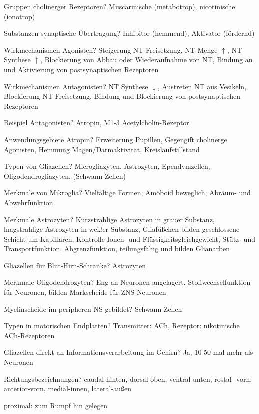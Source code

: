 \documentclass[a4paper]{article}
\begin{document}
\begin{multicols}{3}
  Gruppen cholinerger Rezeptoren? Muscarinische (metabotrop), nicotinische (ionotrop)

  Substanzen synaptische Übertragung? Inhibitor (hemmend), Aktivator (fördernd)

  Wirkmechanismen Agonisten? Steigerung NT-Freisetzung, NT Menge $\uparrow$, NT Synthese $\uparrow$, Blockierung von Abbau oder Wiederaufnahme von NT, Bindung an und Aktivierung von postsynaptischen Rezeptoren

  Wirkmechanismen Antagonisten? NT Synthese $\downarrow$, Austreten NT aus Vesikeln, Blockierung NT-Freisetzung, Bindung und Blockierung von postsynaptischen Rezeptoren

  Beispiel Antagonisten? Atropin, M1-3 Acetylcholin-Rezeptor


  Anwendungsgebiete Atropin? Erweiterung Pupillen, Gegengift cholinerge Agonisten, Hemmung Magen/Darmaktivität, Kreislaufstillstand

  Typen von Gliazellen? Microgliazyten, Astrozyten, Ependymzellen, Oligodendrogliazyten, (Schwann-Zellen)

  Merkmale von Mikroglia? Vielfältige Formen, Amöboid beweglich, Abräum- und Abwehrfunktion

  Merkmale Astrozyten? Kurzstrahlige Astrozyten in grauer Substanz, lnagstrahlige Astrozyten in weißer Substanz, Gliafüßchen bilden geschlossene Schicht um Kapillaren, Kontrolle Ionen- und Flüssigkeitsgleichgewicht, Stütz- und Transportfunktion, Abgrenzfunktion, teilungsfähig und bilden Glianarben

  Gliazellen für Blut-Hirn-Schranke? Astrozyten

  Merkmale Oligodendrozyten? Eng an Neuronen angelagert, Stoffwechselfunktion für Neuronen, bilden Markscheide für ZNS-Neuronen

  Myelinscheide im peripheren NS gebildet? Schwann-Zellen

  Typen in motorischen Endplatten? Transmitter: ACh, Rezeptor: nikotinische ACh-Rezeptoren

  Gliazellen direkt an Informationsverarbeitung im Gehirn? Ja, 10-50 mal mehr als Neuronen%

  Richtungsbezeichnungen? caudal-hinten, dorsal-oben, ventral-unten, rostal- vorn, anterior-vorn, medial-innen, lateral-außen

  proximal: zum Rumpf hin gelegen


\end{multicols}
\end{document}

